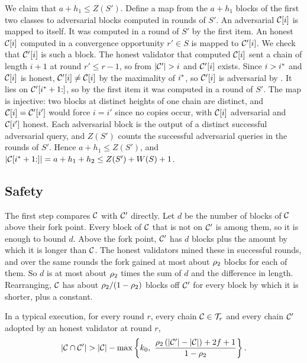 \begin{proofof}{}
    We claim that $a+h_1\le Z(S')$. Define a map from the $a+h_1$ blocks of the
    first two classes to adversarial blocks computed in rounds of $S'$. An
    adversarial $\mathcal{C}[i]$ is mapped to itself. It was computed in a round of $S'$
    by the first item. An honest $\mathcal{C}[i]$ computed in a convergence
    opportunity $r'\in S$ is mapped to $\mathcal{C}'[i]$. We check that $\mathcal{C}'[i]$ is such
    a block. The honest validator that computed $\mathcal{C}[i]$ sent a chain of length
    $i+1$ at round $r'\le r-1$, so from  $\lvert \mathcal{C}'\rvert>i$ and
    $\mathcal{C}'[i]$ exists. Since $i>i^{*}$ and $\mathcal{C}[i]$ is honest, $\mathcal{C}'[i]\ne\mathcal{C}[i]$
    by the maximality of $i^{*}$, so $\mathcal{C}'[i]$ is adversarial by
    . It lies on $\mathcal{C}'[i^{*}+1{:}]$, so by the first item
    it was computed in a round of $S'$. The map is injective: two blocks at
    distinct heights of one chain are distinct, and $\mathcal{C}[i]=\mathcal{C}'[i']$ would
    force $i=i'$ since no copies occur, with $\mathcal{C}[i]$ adversarial and $\mathcal{C}[i']$
    honest. Each adversarial block is the output of a distinct successful
    adversarial query, and $Z(S')$ counts the successful adversarial queries in
    the rounds of $S'$. Hence $a+h_1\le Z(S')$, and
    $\lvert \mathcal{C}[i^{*}+1{:}]\rvert=a+h_1+h_2\le Z(S')+W(S)+1$.
\end{proofof}

\subsection{Safety}

The first step compares $\mathcal{C}$ with $\mathcal{C}'$ directly. Let $d$ be the number of
blocks of $\mathcal{C}$ above their fork point. Every block of $\mathcal{C}$ that is not on
$\mathcal{C}'$ is among them, so it is enough to bound $d$. Above the fork point,
$\mathcal{C}'$ has $d$ blocks plus the amount by which it is longer than $\mathcal{C}$. The
honest validators mined these in successful rounds, and over the same rounds
the fork gained at most about $\rho_2$ blocks for each of them. So $d$ is at
most about $\rho_2$ times the sum of $d$ and the difference in length.
Rearranging, $\mathcal{C}$ has about $\rho_2/(1-\rho_2)$ blocks off $\mathcal{C}'$ for
every block by which it is shorter, plus a constant.

\begin{lemma}\label{lem.prefix}
    In a typical execution, for every round $r$, every chain $\mathcal{C}\in\mathcal{T}_r$ and
    every chain $\mathcal{C}'$ adopted by an honest validator at round $r$,
    \[
        \lvert \mathcal{C}\cap\mathcal{C}'\rvert > \lvert \mathcal{C}\rvert - \max\left\{k_0,\
        \frac{\rho_2\left(\lvert \mathcal{C}'\rvert-\lvert \mathcal{C}\rvert\right)+2f+1}{1-\rho_2}\right\}.
    \]
\end{lemma}

